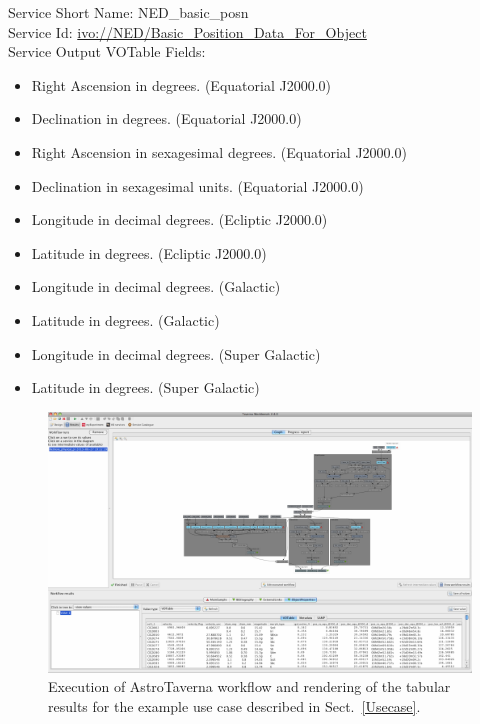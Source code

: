 \documentclass[final,authoryear,5p,times,twocolumn]{elsarticle}
\begin{document}
\begin{minipage}[h]{0.99\columnwidth}
  \small \vspace{\baselineskip}
  \noindent Service Short Name: NED\_basic\_posn\\
  Service Id: \url{ivo://NED/Basic\_Position\_Data\_For\_Object}\\
  Service Output VOTable Fields:
  \begin{itemize}
	  \item Right Ascension in degrees. (Equatorial J2000.0)
	  \item Declination in degrees. (Equatorial J2000.0)
	  \item Right Ascension in sexagesimal degrees. (Equatorial J2000.0)
	  \item Declination in sexagesimal units. (Equatorial J2000.0)
	  \item Longitude in decimal degrees. (Ecliptic J2000.0)
	  \item Latitude in degrees. (Ecliptic J2000.0)
	  \item Longitude in decimal degrees. (Galactic)
	  \item Latitude in degrees. (Galactic)
	  \item Longitude in decimal degrees. (Super Galactic)
	  \item Latitude in degrees. (Super Galactic)
  \end{itemize}
\end{minipage}

\begin{figure}
\centering 
\includegraphics[width=0.99\columnwidth]{WfExec.pdf}
\caption{
Execution of AstroTaverna workflow and rendering of the tabular results for the example use case described in Sect.~\ref{Usecase}.
}
\label{fig:WfExec}
\end{figure}
\end{document}
